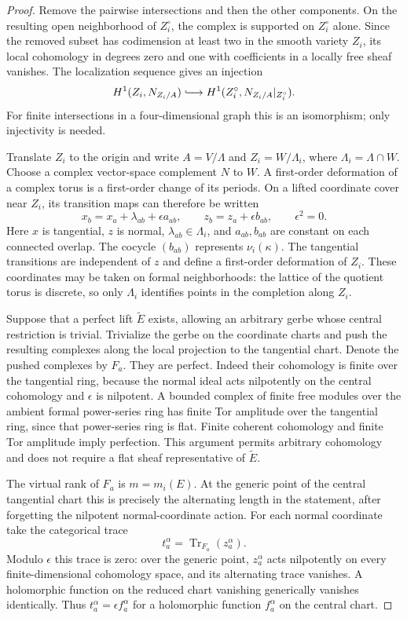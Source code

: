 \begin{proof}
Remove the pairwise intersections and then the other components. On the resulting open neighborhood of $Z_i^\circ$, the complex is supported on $Z_i^\circ$ alone. Since the removed subset has codimension at least two in the smooth variety $Z_i$, its local cohomology in degrees zero and one with coefficients in a locally free sheaf vanishes. The localization sequence gives an injection
\[
 H^1(Z_i,N_{Z_i/A})\lhook\joinrel\longrightarrow
 H^1(Z_i^\circ,N_{Z_i/A}|_{Z_i^\circ}).
\]
For finite intersections in a four-dimensional graph this is an isomorphism; only injectivity is needed.

Translate $Z_i$ to the origin and write $A=V/\Lambda$ and
$Z_i=W/\Lambda_i$, where $\Lambda_i=\Lambda\cap W$. Choose a complex
vector-space complement $N$ to $W$. A first-order deformation of a complex
torus is a first-order change of its periods. On a lifted coordinate cover
near $Z_i$, its transition maps can therefore be written
\[
 x_b=x_a+\lambda_{ab}+\epsilon a_{ab},\qquad
 z_b=z_a+\epsilon b_{ab},\qquad \epsilon^2=0.
\]
Here $x$ is tangential, $z$ is normal, $\lambda_{ab}\in\Lambda_i$, and
$a_{ab},b_{ab}$ are constant on each connected overlap. The cocycle
$(b_{ab})$ represents $\nu_i(\kappa)$. The tangential transitions are
independent of $z$ and define a first-order deformation of $Z_i$.
These coordinates may be taken on formal neighborhoods: the lattice of
the quotient torus is discrete, so only $\Lambda_i$ identifies points in
the completion along $Z_i$.

Suppose that a perfect lift $\widetilde E$ exists, allowing an arbitrary
gerbe whose central restriction is trivial. Trivialize the gerbe on the
coordinate charts and push the resulting complexes along the local
projection to the tangential chart. Denote the pushed complexes by $F_a$.
They are perfect. Indeed their cohomology is finite over the tangential
ring, because the normal ideal acts nilpotently on the central
cohomology and $\epsilon$ is nilpotent. A bounded complex of finite free
modules over the ambient formal power-series ring has finite Tor
amplitude over the tangential ring, since that power-series ring is flat.
Finite coherent cohomology and finite Tor amplitude imply perfection.
This argument permits arbitrary cohomology and does not require a flat
sheaf representative of $\widetilde E$.

The virtual rank of $F_a$ is $m=m_i(E)$. At the generic point of the
central tangential chart this is precisely the alternating length in the
statement, after forgetting the nilpotent normal-coordinate action.
For each normal coordinate take the categorical trace
\[
 t_a^\alpha=\operatorname{Tr}_{F_a}(z_a^\alpha).
\]
Modulo $\epsilon$ this trace is zero: over the generic point,
$z_a^\alpha$ acts nilpotently on every finite-dimensional cohomology
space, and its alternating trace vanishes. A holomorphic function on the
reduced chart vanishing generically vanishes identically. Thus
$t_a^\alpha=\epsilon f_a^\alpha$ for a holomorphic function
$f_a^\alpha$ on the central chart.


\end{proof}
